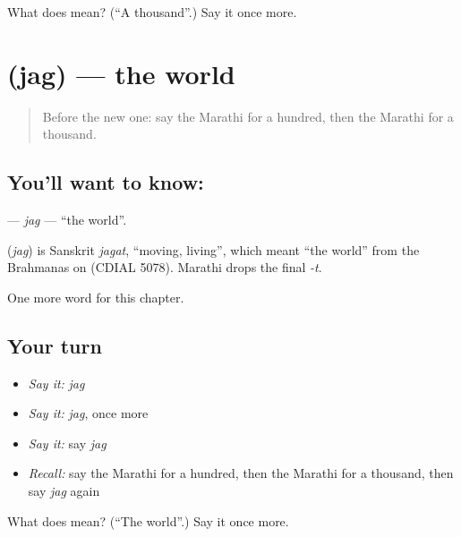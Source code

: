 \begin{tcolorbox}[breakable,colback=teal!4,colframe=teal!35!black,title={Before you move on}]
What does  mean? (\textquotedblleft{}A thousand\textquotedblright{}.) Say it once more.
\end{tcolorbox}
\section[\texorpdfstring{\mr{जग} (jag)}{जग (jag)}]{ (jag) — the world}

\label{lesson:MR-C119-jag}



\begin{quote}
Before the new one: say the Marathi for a hundred, then the Marathi for a thousand.
\end{quote}

\subsection*{You'll want to know: }
\textbf{} — \emph{jag} — \textquotedblleft{}the world\textquotedblright{}.

\begin{cousinweb}
\textbf{} (\emph{jag}) is Sanskrit \emph{jagat}, \textquotedblleft{}moving, living\textquotedblright{}, which meant \textquotedblleft{}the world\textquotedblright{} from the Brahmanas on (CDIAL 5078). Marathi drops the final \emph{-t}.
\end{cousinweb}

\begin{grammarlens}[title={What you've built}]
One more word for this chapter.
\end{grammarlens}

\subsection*{Your turn}
\begin{itemize}
\raggedright
  \item \emph{Say it:} \emph{jag}
  \item \emph{Say it:} \emph{jag}, once more
  \item \emph{Say it:} say \emph{jag}
  \item \emph{Recall:} say the Marathi for a hundred, then the Marathi for a thousand, then say \emph{jag} again
\end{itemize}

\begin{tcolorbox}[breakable,colback=teal!4,colframe=teal!35!black,title={Before you move on}]
What does  mean? (\textquotedblleft{}The world\textquotedblright{}.) Say it once more.
\end{tcolorbox}
